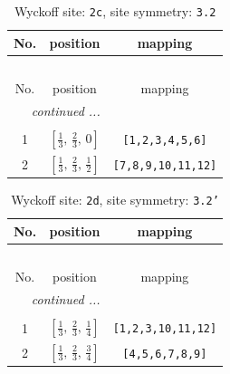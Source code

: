 \documentclass[fleqn,8pt]{jsarticle}
\begin{document}
\begin{longtable}{ccc}
\caption{Wyckoff site: {\tt 2c}, site symmetry: {\tt 3.2}}
 \\
 \hline \hline
No. & position & mapping \\ \hline \endfirsthead

\multicolumn{2}{l}{\tablename\ \thetable{}} \\
 \hline \hline
No. & position & mapping \\ \hline \endhead

 \hline \hline
\multicolumn{2}{r}{\footnotesize\it continued ...} \\ \endfoot

 \hline \hline
\multicolumn{2}{r}{} \\ \endlastfoot

1 & $\left[ \frac{1}{3},\, \frac{2}{3},\, 0 \right]$ & {\tt [1,2,3,4,5,6]} \\ \hline
2 & $\left[ \frac{1}{3},\, \frac{2}{3},\, \frac{1}{2} \right]$ & {\tt [7,8,9,10,11,12]} \\
\end{longtable}
\renewcommand{\arraystretch}{1.2}
\begin{longtable}{ccc}
\caption{Wyckoff site: {\tt 2d}, site symmetry: {\tt 3.2'}}
 \\
 \hline \hline
No. & position & mapping \\ \hline \endfirsthead

\multicolumn{2}{l}{\tablename\ \thetable{}} \\
 \hline \hline
No. & position & mapping \\ \hline \endhead

 \hline \hline
\multicolumn{2}{r}{\footnotesize\it continued ...} \\ \endfoot

 \hline \hline
\multicolumn{2}{r}{} \\ \endlastfoot

1 & $\left[ \frac{1}{3},\, \frac{2}{3},\, \frac{1}{4} \right]$ & {\tt [1,2,3,10,11,12]} \\ \hline
2 & $\left[ \frac{1}{3},\, \frac{2}{3},\, \frac{3}{4} \right]$ & {\tt [4,5,6,7,8,9]} \\
\end{longtable}
\renewcommand{\arraystretch}{1.2}
\end{document}
